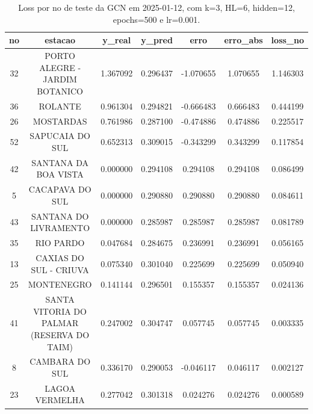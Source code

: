 \begin{table}[h]
\centering
\caption{Loss por no de teste da GCN em 2025-01-12, com k=3, HL=6, hidden=12, epochs=500 e lr=0.001.}
\label{tab:gcn_loss_k3_hl6_h12_e500_d20250112}
\begin{tabular}{ccccccc}
\toprule
no & estacao & y\_real & y\_pred & erro & erro\_abs & loss\_no \\
\midrule
32 & PORTO ALEGRE - JARDIM BOTANICO & 1.367092 & 0.296437 & -1.070655 & 1.070655 & 1.146303 \\
36 & ROLANTE & 0.961304 & 0.294821 & -0.666483 & 0.666483 & 0.444199 \\
26 & MOSTARDAS & 0.761986 & 0.287100 & -0.474886 & 0.474886 & 0.225517 \\
52 & SAPUCAIA DO SUL & 0.652313 & 0.309015 & -0.343299 & 0.343299 & 0.117854 \\
42 & SANTANA DA BOA VISTA & 0.000000 & 0.294108 & 0.294108 & 0.294108 & 0.086499 \\
5 & CACAPAVA DO SUL & 0.000000 & 0.290880 & 0.290880 & 0.290880 & 0.084611 \\
43 & SANTANA DO LIVRAMENTO & 0.000000 & 0.285987 & 0.285987 & 0.285987 & 0.081789 \\
35 & RIO PARDO & 0.047684 & 0.284675 & 0.236991 & 0.236991 & 0.056165 \\
13 & CAXIAS DO SUL - CRIUVA & 0.075340 & 0.301040 & 0.225699 & 0.225699 & 0.050940 \\
25 & MONTENEGRO & 0.141144 & 0.296501 & 0.155357 & 0.155357 & 0.024136 \\
41 & SANTA VITORIA DO PALMAR (RESERVA DO TAIM) & 0.247002 & 0.304747 & 0.057745 & 0.057745 & 0.003335 \\
8 & CAMBARA DO SUL & 0.336170 & 0.290053 & -0.046117 & 0.046117 & 0.002127 \\
23 & LAGOA VERMELHA & 0.277042 & 0.301318 & 0.024276 & 0.024276 & 0.000589 \\
\bottomrule
\end{tabular}
\end{table}
